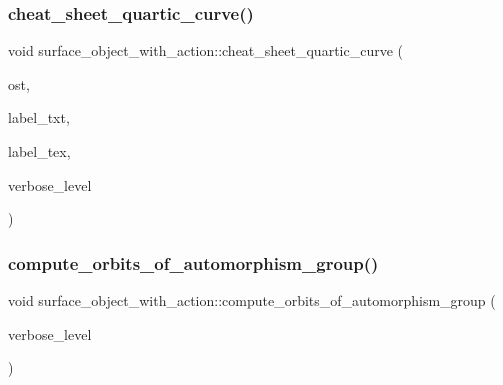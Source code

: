 \mbox{\label{classsurface__object__with__action_a7f42e37fc76dd9b6b113e35c2b886b36}} 
\subsubsection{\texorpdfstring{cheat\+\_\+sheet\+\_\+quartic\+\_\+curve()}{cheat\_sheet\_quartic\_curve()}}
{\footnotesize\ttfamily void surface\+\_\+object\+\_\+with\+\_\+action\+::cheat\+\_\+sheet\+\_\+quartic\+\_\+curve (\begin{DoxyParamCaption}\item[{ostream \&}]{ost,  }\item[{const \mbox{\hyperlink{galois_8h_ab6cc7b4aeb6ea31aba2b3fbfc83ff5e6}{B\+Y\+TE}} $\ast$}]{label\+\_\+txt,  }\item[{const \mbox{\hyperlink{galois_8h_ab6cc7b4aeb6ea31aba2b3fbfc83ff5e6}{B\+Y\+TE}} $\ast$}]{label\+\_\+tex,  }\item[{\mbox{\hyperlink{galois_8h_a09fddde158a3a20bd2dcadb609de11dc}{I\+NT}}}]{verbose\+\_\+level }\end{DoxyParamCaption})}

\mbox{\label{classsurface__object__with__action_a74fe6a01c7d28a4fd30e601824d62c27}} 
\subsubsection{\texorpdfstring{compute\+\_\+orbits\+\_\+of\+\_\+automorphism\+\_\+group()}{compute\_orbits\_of\_automorphism\_group()}}
{\footnotesize\ttfamily void surface\+\_\+object\+\_\+with\+\_\+action\+::compute\+\_\+orbits\+\_\+of\+\_\+automorphism\+\_\+group (\begin{DoxyParamCaption}\item[{\mbox{\hyperlink{galois_8h_a09fddde158a3a20bd2dcadb609de11dc}{I\+NT}}}]{verbose\+\_\+level }\end{DoxyParamCaption})}

